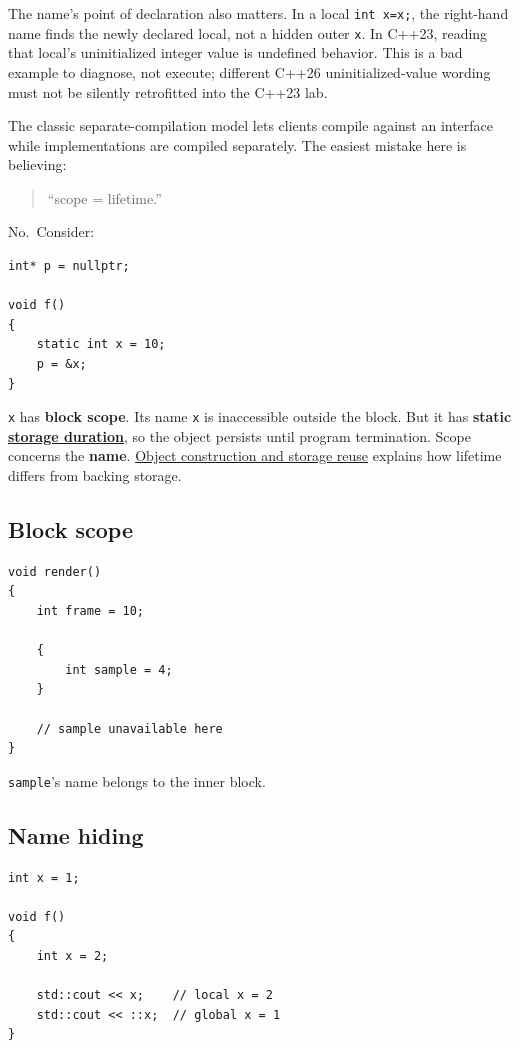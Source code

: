 The name's point of declaration also matters. In a local \texttt{int\ x=x;}, the right-hand name finds the newly declared local, not a hidden outer \texttt{x}. In C++23, reading that local's uninitialized integer value is undefined behavior. This is a bad example to diagnose, not execute; different C++26 uninitialized-value wording must not be silently retrofitted into the C++23 lab.

The classic separate-compilation model lets clients compile against an interface while implementations are compiled separately. The easiest mistake here is believing:

\begin{quote}
``scope = lifetime.''
\end{quote}

No.~Consider:

\begin{verbatim}
int* p = nullptr;

void f()
{
    static int x = 10;
    p = &x;
}
\end{verbatim}

\texttt{x} has \textbf{block scope}. Its name \texttt{x} is inaccessible outside the block. But it has \textbf{static \hyperref[appendix-0b104bcba06b]{storage duration}}, so the object persists until program termination. Scope concerns the \textbf{name}. \hyperref[appendix-a82f9c438857]{Object construction and storage reuse} explains how lifetime differs from backing storage.

\subsection{Block scope}\label{01-foundations-i-ch002-block-scope}

\begin{verbatim}
void render()
{
    int frame = 10;

    {
        int sample = 4;
    }

    // sample unavailable here
}
\end{verbatim}

\texttt{sample}'s name belongs to the inner block.

\subsection{Name hiding}\label{01-foundations-i-ch002-name-hiding}

\begin{verbatim}
int x = 1;

void f()
{
    int x = 2;

    std::cout << x;    // local x = 2
    std::cout << ::x;  // global x = 1
}
\end{verbatim}

